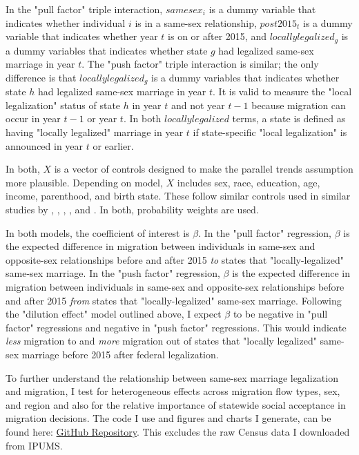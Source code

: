 \documentclass[12pt,letterpaper]{article}
\begin{document}
In the "pull factor" triple interaction, $samesex_i$ is a dummy variable that indicates whether individual $i$ is in a same-sex relationship, $post2015_t$ is a dummy variable that indicates whether year $t$ is on or after 2015, and $locally legalized_g$ is a dummy variables that indicates whether state $g$ had legalized same-sex marriage in year $t$. The "push factor" triple interaction is similar; the only difference is that $locally legalized_g$ is a dummy variables that indicates whether state $h$ had legalized same-sex marriage in year $t$. It is valid to measure the "local legalization" status of state $h$ in year $t$ and not year $t-1$ because migration can occur in year $t-1$ or year $t$. In both $locally legalized$ terms, a state is defined as having "locally legalized" marriage in year $t$ if state-specific "local legalization" is announced in year $t$ or earlier.

 In both, $X$ is a vector of controls designed to make the parallel trends assumption more plausible. Depending on model, $X$ includes sex, race, education, age, income, parenthood, and birth state. These follow similar controls used in similar studies by \citet{1}, \citet{3}, \citet{5}, \citet{7}, and \citet{12}. In both, probability weights are used.

In both models, the coefficient of interest is $\beta$. In the "pull factor" regression, $\beta$ is the expected difference in migration between individuals in same-sex and opposite-sex relationships before and after 2015 \textit{to} states that "locally-legalized" same-sex marriage. In the "push factor" regression, $\beta$ is the expected difference in migration between individuals in same-sex and opposite-sex relationships before and after 2015 \textit{from} states that "locally-legalized" same-sex marriage. Following the "dilution effect" model outlined above, I expect $\beta$ to be negative in "pull factor" regressions and negative in "push factor" regressions. This would indicate \textit{less} migration to and \textit{more} migration out of states that "locally legalized" same-sex marriage before 2015 after federal legalization.

To further understand the relationship between same-sex marriage legalization and migration, I test for heterogeneous effects across migration flow types, sex, and region and also for the relative importance of statewide social acceptance in migration decisions. The code I use and figures and charts I generate, can be found here: \href{https://github.com/nj-rich/same-sex-migration}{GitHub Repository}. This excludes the raw Census data I downloaded from IPUMS.
\end{document}

